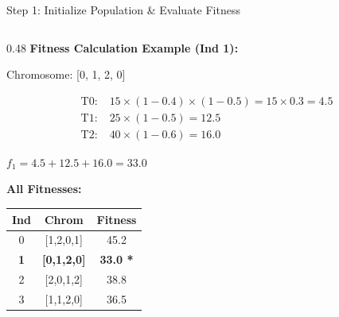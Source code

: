 \documentclass[aspectratio=169,10pt]{beamer}
\begin{document}
\begin{frame}{Step 1: Initialize Population \& Evaluate Fitness}
\begin{columns}[T]
    \begin{column}{0.48\textwidth}
      \textbf{Fitness Calculation Example (Ind 1):}
      
      {\small Chromosome: [0, 1, 2, 0]}
      
      {\scriptsize
      \begin{align*}
        \text{T0:} &\; 15 \times (1-0.4) \times (1-0.5) = 15 \times 0.3 = 4.5 \\
        \text{T1:} &\; 25 \times (1-0.5) = 12.5 \\
        \text{T2:} &\; 40 \times (1-0.6) = 16.0
      \end{align*}}
      
      {\small $f_1 = 4.5 + 12.5 + 16.0 = \mathbf{33.0}$}
      
      \vspace{0.3cm}
      \textbf{All Fitnesses:}
      
      \begin{tabular}{ccc}
        \toprule
        \rowcolor{navymid}
        \color{white}\textbf{Ind} & \color{white}\textbf{Chrom} & \color{white}\textbf{Fitness} \\
        \midrule
        0 & [1,2,0,1] & 45.2 \\
        \rowcolor{lightgreen}
        \textbf{1} & \textbf{[0,1,2,0]} & \cellcolor{mygreen}\color{white}\textbf{33.0 *} \\
        2 & [2,0,1,2] & 38.8 \\
        3 & [1,1,2,0] & 36.5 \\
        \bottomrule
      \end{tabular}
    \end{column}
  \end{columns}
\end{frame}
\end{document}
